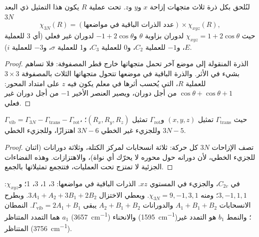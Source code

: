 \begin{proposition}\label{prop:b3:group-theory-applied:gamma-3n}
لنُلحق بكل ذرة ثلاث متجهات إزاحة $x$ و$y$ و$z$. تحت عملية
$R$ يكون  هذا التمثيل ذي البعد $3N$
\[
\chi_{3N}(R) = (\text{عدد الذرات الباقية في مواضعها}) \times \chi_{xyz}(R),
\]
حيث $\chi_{xyz} = 1 + 2\cos\theta$ لدوران بزاوية $\theta$ و$-1 + 2\cos\theta$
لدوران غير فعلي (أي 3 للعملية $E$، و$-1$ للعملية $C_2$، و0 للعملية $C_3$، و1 للعملية $\sigma$،
و$-3$ للعملية $i$).
\end{proposition}

\begin{proof}
الذرة المنقولة إلى موضع آخر تحمل متجهاتها خارج قطر
المصفوفة: فلا تساهم بشيء في الأثر. والذرة الباقية في موضعها
تتحول متجهاتها الثلاث بالمصفوفة $3\times3$ للعملية $R$، التي يُحسب أثرها
في معلم يكون فيه $z$ على امتداد المحور: $\cos\theta + \cos\theta + 1$ من أجل
دوران، ويصير العنصر الأخير $-1$ من أجل دوران غير فعلي.
\end{proof}

\begin{proposition}[عدّ الاهتزازات]\label{prop:b3:group-theory-applied:mode-count}
$\Gamma_{\mathrm{vib}} = \Gamma_{3N} - \Gamma_{\mathrm{trans}} - \Gamma_{\mathrm{rot}}$، حيث
$\Gamma_{\mathrm{trans}}$ تمثيل $(x, y, z)$ و$\Gamma_{\mathrm{rot}}$ تمثيل
$(R_x, R_y, R_z)$؛ وللجزيء غير الخطي $3N - 6$ اهتزازًا، وللجزيء
الخطي $3N - 5$.
\end{proposition}

\begin{proof}
تصف الإزاحات $3N$ كل حركة: ثلاثة انسحابات لمركز
الكتلة، وثلاثة دورانات (اثنان للجزيء الخطي، لأن دورانه
حول محوره لا يحرّك أي نواة)، والاهتزازات. وهذه الفضاءات الجزئية لا
تمتزج تحت العمليات، فتتجمع تمثيلاتها بالجمع.
\end{proof}

\begin{example}[الماء]\label{ex:b3:group-theory-applied:water}
 في $C_{2v}$، والجزيء في المستوي $xz$. الذرات الباقية في مواضعها: 3، 1، 3، 1؛
و$\chi_{xyz}$: $3, -1, 1, 1$؛ ومنه $\chi_{3N} = 9, -1, 3, 1$. ويعطي الاختزال $3A_1 +
A_2 + 3B_1 + 2B_2$. وبطرح الانسحابات $A_1 + B_1 + B_2$ والدورانات $A_2 + B_1 + B_2$
يبقى $\Gamma_{\mathrm{vib}} = 2A_1 + B_1$. النمطان $a_1$ هما التمدد
المتناظر (\qty{3657}{cm^{-1}}) والانحناء (\qty{1595}{cm^{-1}})؛ والنمط $b_1$ هو
التمدد غير المتناظر (\qty{3756}{cm^{-1}}).
\end{example}

